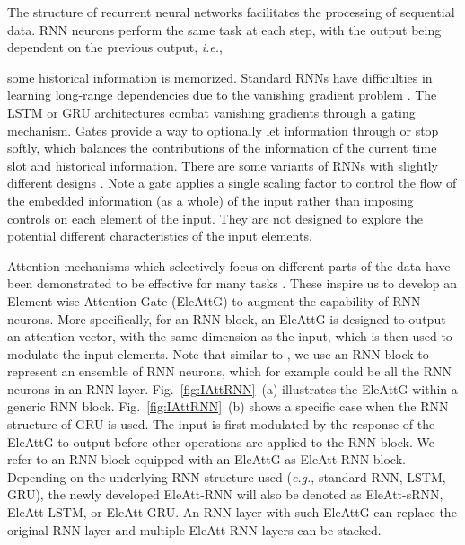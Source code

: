 \documentclass[runningheads]{llncs}
\newcommand{\Outer}{Element-wise}
\newcommand{\EleAttGn}{{EleAttG}}
\begin{document}
The structure of recurrent neural networks facilitates the processing of sequential data. RNN neurons perform the same task at each step, with the output being dependent on the previous output, {\it i.e.}, {{some} historical information is memorized. Standard RNNs have difficulties in learning long-range dependencies due to the vanishing gradient problem \cite{jozefowicz2015empirical}. The LSTM \cite{hochreiter1997long} or GRU \cite{cho2014learning} architectures combat vanishing gradients through a gating mechanism. Gates provide a way to optionally let information through or stop softly, which balances the contributions of the information of the current time slot and historical information. There are some variants of RNNs with slightly different designs \cite{jozefowicz2015empirical}. {Note a gate applies a single scaling factor to control the flow of the embedded information (as a whole) of the input rather than imposing controls on each element of the input.} They are not designed to explore the potential different characteristics of the input elements.
	
	Attention mechanisms which selectively focus on different parts
	of the data have been demonstrated to be effective for many tasks \cite{luong2015effective,vaswani2017attention,xu2015show,li2017attentive,sharma2015actionattention,wang2016hierarchical}. These inspire us to develop an \Outer-Attention Gate (\EleAttGn) to augment the capability of RNN neurons. More specifically, for an RNN block, an EleAttG is designed to output an attention vector, with the same dimension as the input, which is then used to modulate the input elements. Note that similar to \cite{LSTMblog}, we use an RNN block to represent an ensemble of  RNN neurons, which for example could be all the RNN neurons in an RNN layer. Fig.~\ref{fig:IAttRNN}~(a) illustrates the EleAttG within a generic RNN block. Fig.~\ref{fig:IAttRNN}~(b) shows a specific case when the RNN structure of GRU is used.  The input  is first modulated by the response of the EleAttG to output  before other operations are applied to the RNN block. We refer to an RNN block equipped with an EleAttG as EleAtt-RNN block. Depending on the underlying RNN structure used ({\it e.g.}, standard RNN, LSTM, GRU), the newly developed EleAtt-RNN will also be denoted as EleAtt-sRNN, EleAtt-LSTM, or EleAtt-GRU. An RNN layer with such EleAttG can replace the original RNN layer and multiple EleAtt-RNN layers can be stacked.

}
\end{document}
